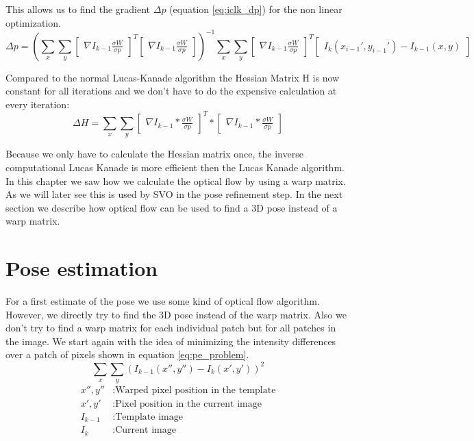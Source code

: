 \documentclass[11pt,a4paper,titlepage,oneside]{report}
\begin{document}
This allows us to find the gradient $\Delta p$ (equation \ref{eq:iclk_dp}) for the non linear optimization.
\tiny
\begin{equation}\label{eq:iclk_dp}
  \Delta p=(\sum_x\sum_y\begin{bmatrix}\nabla I_{k-1}\frac{\sigma W}{\sigma p}\end{bmatrix}^T\begin{bmatrix}\nabla I_{k-1}\frac{\sigma W}{\sigma p}\end{bmatrix})^{-1}
  \sum_x\sum_y\begin{bmatrix}\nabla I_{k-1}\frac{\sigma W}{\sigma p}\end{bmatrix}^T\begin{bmatrix}I_{k}(x_{i-1}',y_{i-1}') - I_{k-1}(x,y)\end{bmatrix}
\end{equation}
\normalsize

Compared to the normal Lucas-Kanade algorithm the Hessian Matrix H is now constant for all iterations and we don't have to do the expensive calculation at every iteration:
\begin{equation}
  \Delta H=\sum_x\sum_y\begin{bmatrix}\nabla I_{k-1}*\frac{\sigma W}{\sigma p}\end{bmatrix}^T*\begin{bmatrix}\nabla I_{k-1}*\frac{\sigma W}{\sigma p}\end{bmatrix}
\end{equation}

Because we only have to calculate the Hessian matrix once, the inverse computational Lucas Kanade is more efficient then the Lucas Kanade algorithm.\\
In this chapter we saw how we calculate the optical flow by using a warp matrix. As we will later see this is used by SVO in the pose refinement step. In the next section we describe how optical flow can be used to find a 3D pose instead of a warp matrix.

\section{Pose estimation}\label{sec:pose_estimation}
For a first estimate of the pose we use some kind of optical flow algorithm. However, we directly try to find the 3D pose instead of the warp matrix. Also we don't try to find a warp matrix for each individual patch but for all patches in the image. We start again with the idea of minimizing the intensity differences over a patch of pixels shown in equation \ref{eq:pe_problem}.
\begin{equation}\label{eq:pe_problem}
  \sum_x\sum_y(I_{k-1}(x'',y'')-I_{k}(x',y'))^2
\end{equation}
\begin{align*}
  x'',y''    &:  \text{Warped pixel position in the template}\\
  x',y'      &:  \text{Pixel position in the current image}\\
  I_{k-1}        &:  \text{Template image}\\
  I_{k}          &:  \text{Current image}
\end{align*}
\end{document}
